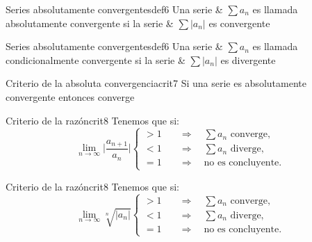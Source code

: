 \documentclass[12pt,a4paper]{article}
\begin{document}
\begin{definicion}{Series absolutamente convergentes}{def6}
    Una serie & $\sum a_n$ es llamada absolutamente convergente si la serie & $\sum |a_n|$ es convergente
\end{definicion}

\begin{definicion}{Series absolutamente convergentes}{def6}
    Una serie & $\sum a_n$ es llamada condicionalmente convergente si la serie & $\sum |a_n|$ es divergente
\end{definicion}

\begin{teorema}{Criterio de la absoluta convergencia}{crit7} 
    Si una serie es absolutamente convergente entonces converge
\end{teorema}

\begin{teorema}{Criterio de la razón}{crit8}
    Tenemos que si:
    \[ 
        \lim_{n \to \infty} \lvert \frac{a_{n + 1}}{a_n} \rvert 
        \begin{cases}
            > 1 \quad &\Rightarrow \quad \sum a_n \text{ converge}, \\
            < 1 \quad &\Rightarrow \quad \sum a_n \text{ diverge}, \\
            = 1 \quad &\Rightarrow \quad \text{no es concluyente}.
        \end{cases}
    \]
\end{teorema}

\begin{teorema}{Criterio de la razón}{crit8}
    Tenemos que si:
    \[ 
        \lim_{n \to \infty} \sqrt[n]{\lvert a_n \rvert} 
        \begin{cases}
            > 1 \quad &\Rightarrow \quad \sum a_n \text{ converge}, \\
            < 1 \quad &\Rightarrow \quad \sum a_n \text{ diverge}, \\
            = 1 \quad &\Rightarrow \quad \text{no es concluyente}.
        \end{cases}
    \]
\end{teorema}
\end{document}
